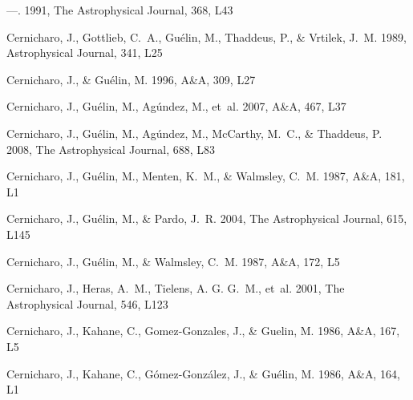 \documentclass[twocolumn]{aastex631}
\begin{document}
\begin{thebibliography}{}
---. 1991{}, The Astrophysical Journal, 368, L43

Cernicharo, J., Gottlieb, C.~A., Gu{\'e}lin, M., Thaddeus, P., \& Vrtilek,
  J.~M. 1989, Astrophysical Journal, 341, L25

Cernicharo, J., \& Gu{\'e}lin, M. 1996, A{\&}A, 309, L27

Cernicharo, J., Gu{\'e}lin, M., Ag{\'u}ndez, M., {et~al.} 2007, A{\&}A, 467,
  L37

Cernicharo, J., Gu{\'e}lin, M., Ag{\'u}ndez, M., McCarthy, M.~C., \& Thaddeus,
  P. 2008, The Astrophysical Journal, 688, L83

Cernicharo, J., Gu{\'e}lin, M., Menten, K.~M., \& Walmsley, C.~M.
  1987{}, A{\&}A, 181, L1

Cernicharo, J., Gu{\'e}lin, M., \& Pardo, J.~R. 2004, The Astrophysical
  Journal, 615, L145

Cernicharo, J., Gu{\'e}lin, M., \& Walmsley, C.~M. 1987{}, A{\&}A,
  172, L5

Cernicharo, J., Heras, A.~M., Tielens, A. G. G.~M., {et~al.} 2001, The
  Astrophysical Journal, 546, L123

Cernicharo, J., Kahane, C., Gomez-Gonzales, J., \& Guelin, M.
  1986{}, A{\&}A, 167, L5

Cernicharo, J., Kahane, C., G{\'o}mez-Gonz{\'a}lez, J., \& Gu{\'e}lin, M.
  1986{}, A{\&}A, 164, L1


\end{thebibliography}
\end{document}
